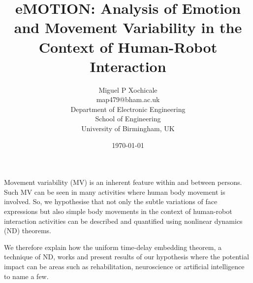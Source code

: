 \documentclass[12pt]{article}
\author{Miguel P Xochicale\\
map479@bham.ac.uk \\
Department of Electronic Engineering\\
School of Engineering\\
University of Birmingham, UK}
\title{
eMOTION: Analysis of Emotion and Movement Variability in the Context of Human-Robot Interaction
}
\date{\today}
\begin{document}
\maketitle

Movement variability (MV) is an inherent feature within and between persons.
Such MV can be seen in many activities where human body movement is involved. 
So, we hypothesise that not only the subtle 
variations of face expressions but also simple body movements 
in the context of human-robot interaction activities
can be described and quantified 
using nonlinear dynamics (ND) theorems.

We therefore explain how the uniform time-delay embedding theorem, a technique of ND, works 
and present results of our hypothesis where the potential impact can be areas such as 
rehabilitation, neuroscience or artificial intelligence
to name a few.
\end{document}

